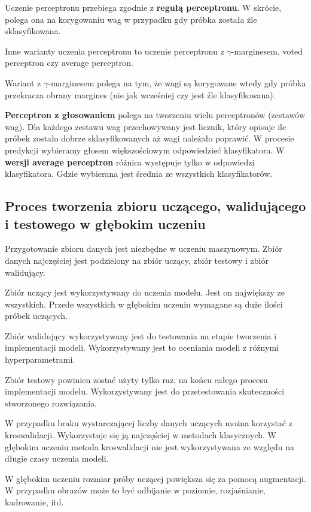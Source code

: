 \documentclass[wi]{zut}
\begin{document}
Uczenie perceptronu przebiega zgodnie z \textbf{regułą perceptronu}. W skrócie, polega ona na korygowaniu wag w przypadku gdy próbka została źle sklasyfikowana. 

Inne warianty uczenia perceptronu to uczenie perceptronu z $\gamma$-marginesem, voted perceptron czy average perceptron.

Wariant z $\gamma$-marginesem polega na tym, że wagi są korygowane wtedy gdy próbka przekracza obrany margines (nie jak wcześniej czy jest źle klasyfikowana).

\textbf{Perceptron z głosowaniem} polega na tworzeniu wielu perceptronów (zestawów wag). Dla każdego zestawu wag przechowywany jest licznik, który opisuje ile próbek zostało dobrze sklasyfikowanych aż wagi należało poprawić. W procesie predykcji wybieramy głosem większościowym odpowiedzieć klasyfikatora. W \textbf{wersji average perceptron} różnica występuje tylko w odpowiedzi klasyfikatora. Gdzie wybierana jest średnia ze wszystkich klasyfikatorów.
\question




\subsection{Proces tworzenia zbioru uczącego, walidującego i testowego w głębokim uczeniu}

Przygotowanie zbioru danych jest niezbędne w uczeniu maszynowym. Zbiór danych najczęściej jest podzielony na zbiór uczący, zbiór testowy i zbiór walidujący. 

Zbiór uczący jest wykorzystywany do uczenia modelu. Jest on największy ze wszystkich. Przede wszystkich w głębokim uczeniu wymagane są duże ilości próbek uczących.

Zbiór walidujący wykorzystywany jest do testowania na etapie tworzenia i implementacji modeli. Wykorzystywany jest to oceniania modeli z różnymi hyperparametrami. 

Zbiór testowy powinien zostać użyty tylko raz, na końcu całego procesu implementacji modelu. Wykorzystywany jest do przetestowania skuteczności stworzonego rozwiązania. 

W przypadku braku wystarczającej liczby danych uczących można korzystać z kroswalidacji. Wykorzystuje się ją najczęściej w metodach klasycznych. W głębokim uczeniu metoda kroswalidacji nie jest wykorzystywana ze względu na długie czasy uczenia modeli.

W głębokim uczeniu rozmiar próby uczącej powiększa się za pomocą augmentacji. W przypadku obrazów może to być odbijanie w poziomie, rozjaśnianie, kadrowanie, itd.
\end{document}
